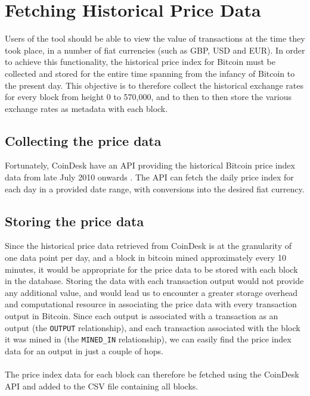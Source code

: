 \chapter{Fetching Historical Price Data}\label{section-price-data}
Users of the tool should be able to view the value of transactions at the time they took place, in a number of fiat currencies (such as GBP, USD and EUR). In order to achieve this functionality, the historical price index for Bitcoin must be collected and stored for the entire time spanning from the infancy of Bitcoin to the present day. This objective is to therefore collect the historical exchange rates for every block from height 0 to 570,000, and to then to then store the various exchange rates as metadata with each block. 

\section{Collecting the price data}
Fortunately, CoinDesk have an API providing the historical Bitcoin price index data from late July 2010 onwards \cite{RefWorks:doc:5cacd8cbe4b092e311880f2b}. The API can fetch the daily price index for each day in a provided date range, with conversions into the desired fiat currency. 

\section{Storing the price data}
Since the historical price data retrieved from CoinDesk is at the granularity of one data point per day, and a block in bitcoin mined approximately every 10 minutes, it would be appropriate for the price data to be stored with each block in the database. Storing the data with each transaction output would not provide any additional value, and would lead us to encounter a greater storage overhead and computational resource in associating the price data with every transaction output in Bitcoin. Since each output is associated with a transaction as an output (the \texttt{OUTPUT} relationship), and each transaction associated with the block it was mined in (the \texttt{MINED\_IN} relationship), we can easily find the price index data for an output in just a couple of hops. 
\\\\
The price index data for each block can therefore be fetched using the CoinDesk API and added to the CSV file containing all blocks.

